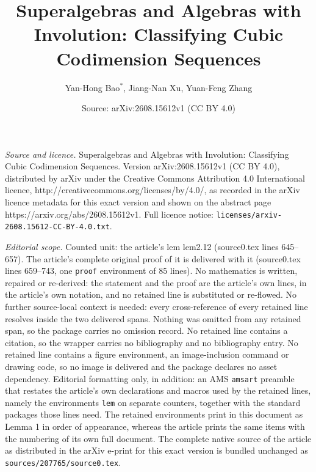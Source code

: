 \documentclass[10pt,a4paper]{amsart}
\title{Superalgebras and Algebras with Involution: Classifying Cubic Codimension Sequences}
\author{Yan-Hong Bao$^*$, Jiang-Nan Xu, Yuan-Feng Zhang}
\date{Source: arXiv:2608.15612v1 (CC BY 4.0)}
\begin{document}
\maketitle

\noindent\emph{Source and licence.} Superalgebras and Algebras with Involution: Classifying Cubic Codimension Sequences. Version arXiv:2608.15612v1 (CC BY 4.0), distributed by arXiv under the Creative Commons Attribution 4.0 International licence, http://creativecommons.org/licenses/by/4.0/, as recorded in the arXiv licence metadata for this exact version and shown on the abstract page https://arxiv.org/abs/2608.15612v1. Full licence notice: \texttt{licenses/arxiv-2608.15612-CC-BY-4.0.txt}.\par\smallskip

\noindent\textit{Editorial scope.} Counted unit: the article's lem lem2.12 (source0.tex lines 645--657). The article's complete original proof of it is delivered with it (source0.tex lines 659--743, one \texttt{proof} environment of 85 lines). No mathematics is written, repaired or re-derived: the statement and the proof are the article's own lines, in the article's own notation, and no retained line is substituted or re-flowed.  No further source-local context is needed: every cross-reference of every retained line resolves inside the two delivered spans.  Nothing was omitted from any retained span, so the package carries no omission record.  No retained line contains a citation, so the wrapper carries no bibliography and no bibliography entry.  No retained line contains a figure environment, an image-inclusion command or drawing code, so no image is delivered and the package declares no asset dependency.  Editorial formatting only, in addition: an AMS \texttt{amsart} preamble that restates the article's own declarations and macros used by the retained lines, namely the environments \texttt{lem} on separate counters, together with the standard packages those lines need.  The retained environments print in this document as Lemma 1 in order of appearance, whereas the article prints the same items with the numbering of its own full document.  The complete native source of the article as distributed in the arXiv e-print for this exact version is bundled unchanged as \texttt{sources/207765/source0.tex}.
\end{document}
